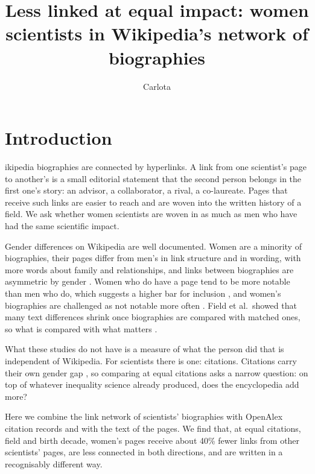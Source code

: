 \documentclass[9pt,twocolumn,twoside,lineno]{pnas-new}
\title{Less linked at equal impact: women scientists in Wikipedia's network of biographies}
\author[a]{Carlota \todo{Surname}}
\author[a]{\todo{Group member 2}}
\author[a]{\todo{Group member 3}}
\affil[a]{Department of Applied Mathematics and Computer Science (DTU Compute), Technical University of Denmark, 2800 Kgs.\ Lyngby, Denmark}
\begin{document}
\maketitle
\thispagestyle{firststyle}

\section*{Introduction}

ikipedia biographies are connected by hyperlinks. A link from one scientist's page to another's is a small editorial statement that the second person belongs in the first one's story: an advisor, a collaborator, a rival, a co-laureate. Pages that receive such links are easier to reach and are woven into the written history of a field. We ask whether women scientists are woven in as much as men who have had the same scientific impact.

Gender differences on Wikipedia are well documented. Women are a minority of biographies, their pages differ from men's in link structure and in wording, with more words about family and relationships, and links between biographies are asymmetric by gender \cite{wagner2015man,graells2015first,wagner2016glass}. Women who do have a page tend to be more notable than men who do, which suggests a higher bar for inclusion \cite{wagner2016glass,adams2019notable}, and women's biographies are challenged as not notable more often \cite{tripodi2023ms}. Field et al.\ showed that many text differences shrink once biographies are compared with matched ones, so what is compared with what matters \cite{field2022controlled}.

What these studies do not have is a measure of what the person did that is independent of Wikipedia. For scientists there is one: citations. Citations carry their own gender gap \cite{lariviere2013bibliometrics}, so comparing at equal citations asks a narrow question: on top of whatever inequality science already produced, does the encyclopedia add more?

Here we combine the link network of scientists' biographies with OpenAlex citation records \cite{priem2022openalex} and with the text of the pages. We find that, at equal citations, field and birth decade, women's pages receive about 40\% fewer links from other scientists' pages, are less connected in both directions, and are written in a recognisably different way.
\end{document}
